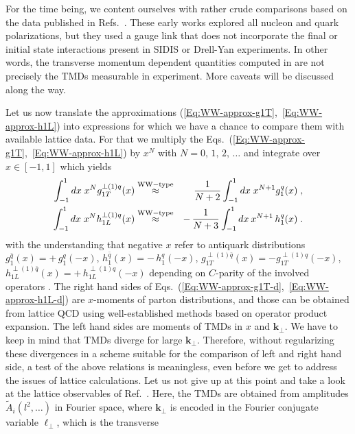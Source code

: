 \documentclass[a4paper,11pt]{article}
\newcommand{\ba}{\begin{eqnarray}}
\newcommand{\ea}{\end{eqnarray}}
\def\bflperp{{\bm \ell}_\perp}
\def\bfkperp{{\bm k}_\perp}
\begin{document}
For the time being, we content ourselves with rather crude comparisons 
based on the data published in Refs.~\cite{Hagler:2009mb,Musch:2010ka}. 
These early works explored all nucleon and quark polarizations, but 
they used a gauge link that does not incorporate the final or initial 
state interactions present in SIDIS or Drell-Yan experiments. In other 
words, the transverse momentum dependent quantities computed in
\cite{Hagler:2009mb,Musch:2010ka} are not precisely the TMDs measurable 
in experiment. More caveats will be discussed along the way.

Let us now translate the approximations
(\ref{Eq:WW-approx-g1T},~\ref{Eq:WW-approx-h1L}) into expressions
for which we have a chance to compare them with available lattice data.
For that we multiply the
Eqs.~(\ref{Eq:WW-approx-g1T},~\ref{Eq:WW-approx-h1L}) by $x^N$
with $N=0,\,1,\,2,\,\dots$ and integrate over $x\in[-1,1]$ which yields
\ba
        \int_{-1}^1 d x\;x^N
       g_{1T}^{\perp(1)q}(x)&\stackrel{\rm WW-type}{\approx}&
        \phantom{-} \,\frac{1}{N+2} \int_{-1}^1 d x \;x^{N+1}g_1^q(x)
        \;,
    \label{Eq:WW-approx-g1T-d}\\
        \int_{-1}^1 d x\;x^N
        h_{1L}^{\perp(1)q}(x)&\stackrel{\rm WW-type}{\approx}&
        -\,\frac{1}{N+3} \int_{-1}^1 d x\: x^{N+1}\,h_1^q(x)
        \;.
    \label{Eq:WW-approx-h1L-d}
\ea
with the understanding that
negative $x$ refer to antiquark distributions
$g_1^{\bar q}(x) = +\,g_1^{q}(-x)$,
$h_1^{\bar q}(x) = -\,h_1^{q}(-x)$,
$g_{1T}^{\perp(1)\bar q}(x) =- g_{1T}^{\perp(1)q}(-x)$,
$h_{1L}^{\perp(1)\bar q}(x) = +\,h_{1L}^{\perp(1)q}(-x)$
depending on $C$-parity of the involved operators \cite{Mulders:1995dh}.
The right hand sides of 
Eqs.~(\ref{Eq:WW-approx-g1T-d},~\ref{Eq:WW-approx-h1L-d}) are $x$-moments 
of parton distributions, and those can be obtained from lattice QCD using 
well-established methods based on operator product expansion. 
The left hand sides are moments of TMDs in $x$ and $\bfkperp$. We have to 
keep in mind that TMDs diverge for large $\bfkperp$. Therefore, without 
regularizing these divergences in a scheme suitable for the comparison of 
left and right hand side, a test of the above relations is meaningless, 
even before we get to address the issues of lattice calculations. Let us 
not give up at this point and take a look at the lattice observables of 
Ref.~\cite{Musch:2010ka}. Here, the TMDs are obtained from amplitudes 
$\tilde A_i(l^2,\ldots)$ in Fourier space, where $\bfkperp$ is encoded 
in the Fourier conjugate variable $\bflperp$, which is the transverse 
\end{document}
